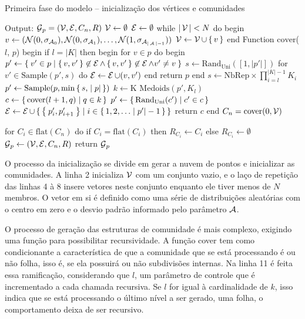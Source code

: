 \documentclass[notes.tex]{subfiles}
\begin{document}
\begin{quadro}[htbp]
\caption{Primeira fase do modelo -- inicialização dos vértices e comunidades}
\label{qua:fase_1}
\begin{algorithm}
Output: $\operatorname{\mathcal{G}}_p = (\operatorname{\mathcal{V}}, \operatorname{\mathcal{E}}, C_n, R)$
$\operatorname{\mathcal{V}} \leftarrow \emptyset$
$\operatorname{\mathcal{E}} \leftarrow \emptyset$
while $|\operatorname{\mathcal{V}}| < N$ do
begin
    $v \leftarrow (\mathcal{N}(0, \sigma_{\operatorname{\mathcal{A}}_0}), \mathcal{N}(0, \sigma_{\operatorname{\mathcal{A}}_1}), \ldots, \mathcal{N}(1, \sigma_{\operatorname{\mathcal{A}}_{|\operatorname{\mathcal{A}}|-1}}))$
    $\operatorname{\mathcal{V}} \leftarrow \operatorname{\mathcal{V}} \cup \set{v}$
end
Function $\text{cover}$($l$, $p$)
begin
    if $l = |K|$ then
    begin
        for $v \in p$ do
        begin
            $p' \leftarrow \Set{v' \in p | \set{v, v'} \not\in \operatorname{\mathcal{E}}\land \set{v, v'} \not\in \operatorname{\mathcal{E}}\land v' \neq v}$
            $s \leftarrow \text{Rand}_\text{Uni}([1, |p'|])$
            for $v'\in \text{Sample}(p', s)$ do $\operatorname{\mathcal{E}} \leftarrow \operatorname{\mathcal{E}} \cup (v, v')$
        end
        return $p$
    end
    $s \leftarrow \text{NbRep}\times\prod_{i=l}^{|K|-1} K_i$
    $p' \leftarrow \text{Sample}(p, \min\set{s, |p|})$
    $k \leftarrow \text{K Medoids}(p', K_l)$ 
    $c \leftarrow \set{\text{cover}(l+1, q) | q \in k}$
    $p' \leftarrow \set{\text{Rand}_\text{Uni}(c') | c' \in c}$
    $\operatorname{\mathcal{E}} \leftarrow \operatorname{\mathcal{E}} \cup \set{\Set{p'_i, p'_{i+1}}| i \in \set{1, 2, \ldots |p'| -1}}$
    return $c$
end
$C_n = \text{cover}(0, \operatorname{\mathcal{V}})$

for $C_i \in \text{flat}(C_n)$ do
    if $C_i = \text{flat}(C_i)$ then $R_{C_i} \leftarrow C_i$
    else $R_{C_i} \leftarrow \emptyset$
$\operatorname{\mathcal{G}}_p \leftarrow (\operatorname{\mathcal{V}}, \operatorname{\mathcal{E}}, C_n, R)$
return $\operatorname{\mathcal{G}}_p$
\end{algorithm}
\end{quadro}

O processo da inicialização se divide em gerar a nuvem de pontos e inicializar as comunidades.
A linha 2 inicializa $\operatorname{\mathcal{V}}$ com um conjunto vazio, e o laço de repetição das linhas 4 à 8 insere vetores neste conjunto enquanto ele tiver menos de  $N$ membros.
O vetor em si é definido como uma série de distribuições aleatórias com o centro em zero e o desvio padrão informado pelo parâmetro $\operatorname{\mathcal{A}}$.

O processo de geração das estruturas de comunidade é mais complexo, exigindo uma função para possibilitar recursividade.
A função cover tem como condicionante a característica de que a comunidade que se está processando é ou não folha, isso é, se ela possuirá ou não subdivisões internas.
Na linha 11 é feita essa ramificação, considerando que $l$, um parâmetro de controle que é incrementado a cada chamada recursiva.
Se $l$ for igual à cardinalidade de $k$, isso indica que se está processando o último nível a ser gerado, uma folha, o comportamento deixa de ser recursivo.
\end{document}
